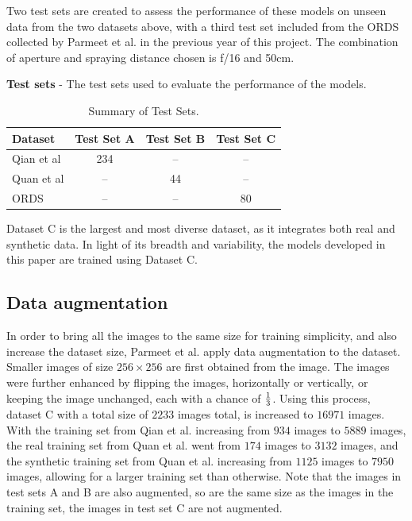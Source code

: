 \documentclass[11pt]{ociamthesis}  %
\begin{document}
Two test sets are created to assess the performance of these models on unseen data from the two datasets above, with a third test set included from the ORDS collected by Parmeet et al.\cite{Parmeet_Report} in the previous year of this project. The combination of aperture and spraying distance chosen is f/16 and 50cm.

\textbf{Test sets} - The test sets used to evaluate the performance of the models.
\begin{table}[h!]
    \centering
    \begin{tabular}{@{}lccc@{}}
        \toprule
        Dataset & Test Set A & Test Set B & Test Set C \\
        \midrule
        Qian et al & 234 & -- & -- \\
        Quan et al & -- & 44 & -- \\
        ORDS       & -- & -- & 80 \\
        \bottomrule
    \end{tabular}
    \caption{Summary of Test Sets.}
    \label{table:test_sets}
\end{table}

Dataset C is the largest and most diverse dataset, as it integrates both real and synthetic data. In light of its breadth and variability, the models developed in this paper are trained using Dataset C.

\subsection{Data augmentation}
In order to bring all the images to the same size for training simplicity, and also increase the dataset size, Parmeet et al.\cite{Parmeet_Report} apply data augmentation to the dataset. Smaller images of size $256 \times 256$ are first obtained from the image. The images were further enhanced by flipping the images, horizontally or vertically, or keeping the image unchanged, each with a chance of $1 \over 3$. Using this process, dataset C with a total size of $2233$ images total, is increased to $16971$ images. With the training set from Qian et al. increasing from $934$ images to $5889$ images, the real training set from Quan et al. went from $174$ images to $3132$ images, and the synthetic training set from Quan et al. increasing from $1125$ images to $7950$ images, allowing for a larger training set than otherwise. Note that the images in test sets A and B are also augmented, so are the same size as the images in the training set, the images in test set C are not augmented.
\end{document}
